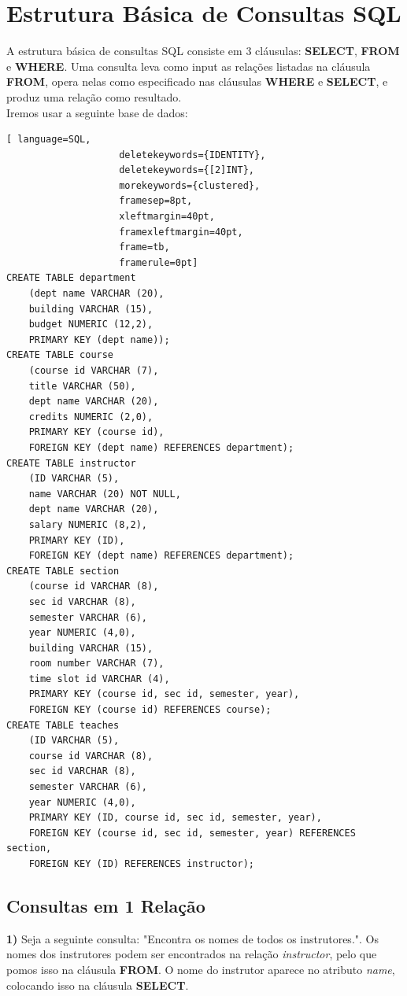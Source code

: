 \documentclass[oneside]{book}
\theoremstyle{definition}
\begin{document}
\section{Estrutura Básica de Consultas SQL}
A estrutura básica de consultas SQL consiste em 3 cláusulas: \textbf{SELECT}, \textbf{FROM} e \textbf{WHERE}. Uma consulta leva como input as relações listadas na cláusula \textbf{FROM}, opera nelas como especificado nas cláusulas \textbf{WHERE} e \textbf{SELECT}, e produz uma relação como resultado. \\
Iremos usar a seguinte base de dados:
\begin{lstlisting}[ language=SQL,
                    deletekeywords={IDENTITY},
                    deletekeywords={[2]INT},
                    morekeywords={clustered},
                    framesep=8pt,
                    xleftmargin=40pt,
                    framexleftmargin=40pt,
                    frame=tb,
                    framerule=0pt]
CREATE TABLE department
    (dept name VARCHAR (20),
    building VARCHAR (15),
    budget NUMERIC (12,2),
    PRIMARY KEY (dept name));
CREATE TABLE course
    (course id VARCHAR (7),
    title VARCHAR (50),
    dept name VARCHAR (20),
    credits NUMERIC (2,0),
    PRIMARY KEY (course id),
    FOREIGN KEY (dept name) REFERENCES department);
CREATE TABLE instructor
    (ID VARCHAR (5),
    name VARCHAR (20) NOT NULL,
    dept name VARCHAR (20),
    salary NUMERIC (8,2),
    PRIMARY KEY (ID),
    FOREIGN KEY (dept name) REFERENCES department);
CREATE TABLE section
    (course id VARCHAR (8),
    sec id VARCHAR (8),
    semester VARCHAR (6),
    year NUMERIC (4,0),
    building VARCHAR (15),
    room number VARCHAR (7),
    time slot id VARCHAR (4),
    PRIMARY KEY (course id, sec id, semester, year),
    FOREIGN KEY (course id) REFERENCES course);
CREATE TABLE teaches
    (ID VARCHAR (5),
    course id VARCHAR (8),
    sec id VARCHAR (8),
    semester VARCHAR (6),
    year NUMERIC (4,0),
    PRIMARY KEY (ID, course id, sec id, semester, year),
    FOREIGN KEY (course id, sec id, semester, year) REFERENCES section,
    FOREIGN KEY (ID) REFERENCES instructor);
\end{lstlisting}

\subsection{Consultas em 1 Relação}
\textbf{1)} Seja a seguinte consulta: "Encontra os nomes de todos os instrutores.". Os nomes dos instrutores podem ser encontrados na relação \textit{instructor}, pelo que pomos isso na cláusula \textbf{FROM}. O nome do instrutor aparece no atributo \textit{name}, colocando isso na cláusula \textbf{SELECT}.
\end{document}
